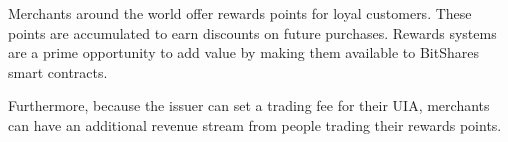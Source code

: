 Merchants around the world offer rewards points for loyal customers. These
points are accumulated to earn discounts on future purchases. Rewards systems
are a prime opportunity to add value by making them available to BitShares
smart contracts.

Furthermore, because the issuer can set a trading fee for their UIA, merchants
can have an additional revenue stream from people trading their rewards points.
